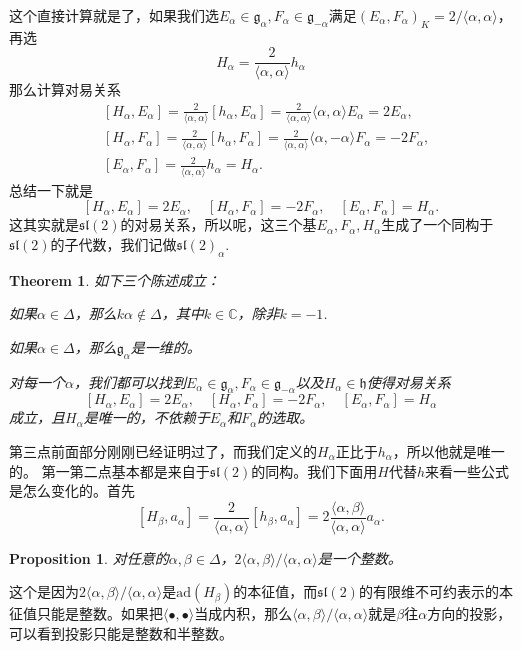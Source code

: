 \documentclass[9pt]{extbook}
\theoremstyle{plain}
\newtheorem{pro}[defi]{Proposition}
\newtheorem{theo}[defi]{Theorem}
\newcommand{\cc}{\mathbb{C}}
\newcommand{\lag}{{\mathfrak{g}}}  %
\newcommand{\ad}{{\mathrm{ad}}}
\begin{document}
这个直接计算就是了，如果我们选$E_\alpha\in\lag_\alpha,F_\alpha\in\lag_{-\alpha}$满足$(E_\alpha,F_{\alpha})_K=2/\langle \alpha,\alpha \rangle$，再选
\[
	H_\alpha=\frac{2}{\langle \alpha,\alpha \rangle}h_\alpha
\]
那么计算对易关系
\[
	\begin{split}
	&[H_\alpha,E_\alpha]=\frac{2}{\langle \alpha,\alpha \rangle}[h_\alpha,E_\alpha]=\frac{2}{\langle \alpha,\alpha \rangle}\langle \alpha,\alpha \rangle E_\alpha=2E_\alpha,\\
	&[H_\alpha,F_\alpha]=\frac{2}{\langle \alpha,\alpha \rangle}[h_\alpha,F_\alpha]=\frac{2}{\langle \alpha,\alpha \rangle}\langle \alpha,-\alpha \rangle F_\alpha=-2F_\alpha,\\
	&[E_\alpha,F_\alpha]=\frac{2}{\langle \alpha,\alpha \rangle}h_\alpha=H_\alpha.
	\end{split}
\]
总结一下就是
\[
	[H_\alpha,E_\alpha]=2E_\alpha,\quad[H_\alpha,F_\alpha]=-2F_\alpha,\quad[E_\alpha,F_\alpha]=H_\alpha.
\]
这其实就是$\mathfrak{sl}(2)$的对易关系，所以呢，这三个基$E_\alpha,F_\alpha,H_\alpha$生成了一个同构于$\mathfrak{sl}(2)$的子代数，我们记做$\mathfrak{sl}(2)_\alpha$.\

\begin{theo}
如下三个陈述成立：

如果$\alpha\in\Delta$，那么$k\alpha\notin \Delta$，其中$k\in \cc$，除非$k=-1$.

如果$\alpha\in\Delta$，那么$\lag_\alpha$是一维的。

对每一个$\alpha$，我们都可以找到$E_\alpha\in\lag_\alpha,F_\alpha\in\lag_{-\alpha}$以及$H_\alpha\in\mathfrak{h}$使得对易关系
\[
[H_\alpha,E_\alpha]=2E_\alpha,\quad[H_\alpha,F_\alpha]=-2F_\alpha,\quad[E_\alpha,F_\alpha]=H_\alpha
\]
成立，且$H_\alpha$是唯一的，不依赖于$E_\alpha$和$F_\alpha$的选取。
\end{theo}
第三点前面部分刚刚已经证明过了，而我们定义的$H_\alpha$正比于$h_\alpha$，所以他就是唯一的。
第一第二点基本都是来自于$\mathfrak{sl}(2)$的同构。我们下面用$H$代替$h$来看一些公式是怎么变化的。首先
\[
	[H_\beta,a_\alpha]=\frac{2}{\langle \alpha,\alpha \rangle}[h_\beta,a_\alpha]=2\frac{\langle \alpha,\beta \rangle}{\langle \alpha,\alpha \rangle} a_\alpha.
\]
\begin{pro}
对任意的$\alpha,\beta\in \Delta$，$2\langle \alpha,\beta \rangle/\langle \alpha,\alpha \rangle$是一个整数。
\end{pro}
这个是因为$2\langle \alpha,\beta \rangle/\langle \alpha,\alpha \rangle$是$\ad(H_\beta)$的本征值，而$\mathfrak{sl}(2)$的有限维不可约表示的本征值只能是整数。如果把$\langle \bullet,\bullet \rangle$当成内积，那么$\langle \alpha,\beta \rangle/\langle \alpha,\alpha \rangle$就是$\beta$往$\alpha$方向的投影，可以看到投影只能是整数和半整数。
\end{document}
